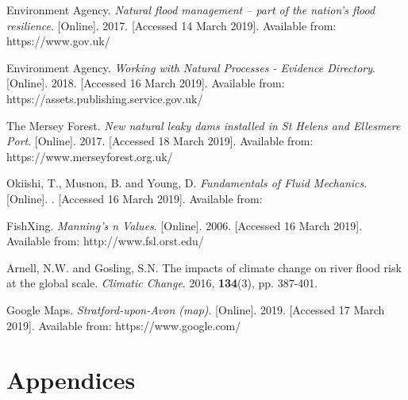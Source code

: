 \documentclass[11pt,a4paper]{article}
\begin{document}
\begin{thebibliography}{}
Environment Agency. \textit{Natural flood management – part of the nation’s flood resilience}. [Online]. 2017. [Accessed 14 March 2019]. Available from: https://www.gov.uk/

Environment Agency. \textit{Working with Natural Processes - Evidence Directory}. [Online]. 2018. [Accessed 16 March 2019]. Available from: https://assets.publishing.service.gov.uk/

The Mersey Forest. \textit{New natural leaky dams installed in St Helens and Ellesmere Port}. [Online]. 2017. [Accessed 18 March 2019]. Available from: https://www.merseyforest.org.uk/

Okiishi, T., Musnon, B. and Young, D. \textit{Fundamentals of Fluid Mechanics}. [Online]. . [Accessed 16 March 2019]. Available from: 

FishXing. \textit{Manning's n Values}. [Online]. 2006. [Accessed 16 March 2019]. Available from: http://www.fsl.orst.edu/

Arnell, N.W. and Gosling, S.N. The impacts of climate change on river flood risk at the global scale. \textit{Climatic Change}. 2016, \textbf{134}(3), pp. 387-401.

Google Maps. \textit{Stratford-upon-Avon (map)}. [Online]. 2019. [Accessed 17 March 2019]. Available from: https://www.google.com/
\end{thebibliography}

\appendix
\section{Appendices}
\end{document}
